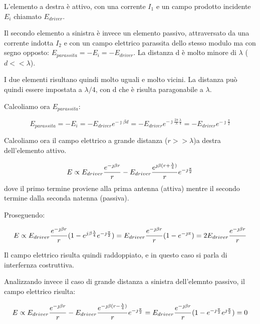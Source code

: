 L'elemento a destra è attivo, con una corrente $I_1$ e un campo prodotto incidente  $E_i$ chiamato $E_{driver}$.

Il secondo elemento a sinistra è invece un elemento passivo, attraversato da una corrente indotta $I_2$ e con un campo elettrico parassita dello stesso modulo ma con segno opposto: $E_{parassita} = -E_i = -E_{driver}$.
La distanza d è molto minore di $\lambda$ ($d<<\lambda$).

I due elementi risultano quindi molto uguali e  molto vicini.
La distanza può quindi essere impostata a $\lambda/4$, con d che è risulta paragonabile a $\lambda$.

Calcoliamo ora $E_{parassita}$:

\begin{equation}
E_{parassita} = -E_i = -E_{driver} e^{-\jmath \beta d} = -E_{driver} e^{-\jmath \frac{2 \pi}{\lambda} \frac{\lambda}{4}} = -E_{driver} e^{-\jmath \frac{\pi}{2}}
\end{equation}

Calcoliamo ora il campo elettrico a grande distanza ($r>>\lambda$)a destra dell'elemento attivo.

\begin{equation}
E \propto E_{driver}\frac{e^{-\jmath \beta r}}{r}-E_{driver}\frac{e^{\jmath\beta(r+\frac{\lambda}{4})}}{r}e^{-\jmath\frac{\pi}{2}}
\end{equation}
dove il primo termine proviene alla prima antenna (attiva) mentre il secondo termine dalla seconda natenna (passiva).

Proseguendo:

\begin{equation}
E \propto E_{driver}\frac{e^{-\jmath \beta r}}{r} (1-e^{j\beta\frac{\lambda}{4}}e^{-\jmath\frac{\pi}{2}}) =  E_{driver}\frac{e^{-\jmath \beta r}}{r} (1-e^{-\jmath\pi}) = 2E_{driver}\frac{e^{-\jmath \beta r}}{r}
\end{equation}

Il campo elettrico risulta quindi raddoppiato, e in questo caso si parla di interfernza costruttiva.

Analizzando invece il caso di grande distanza a sinistra dell'elemnto passivo, il campo elettrico risulta:

\begin{equation}
E \propto E_{driver}\frac{e^{-\jmath \beta r}}{r}-E_{driver}\frac{e^{-\jmath\beta(r-\frac{\lambda}{4})}}{r}e^{-\jmath\frac{\pi}{2}} =  E_{driver}\frac{e^{-\jmath \beta r}}{r} (1-e^{-\jmath\frac{\pi}{2}}e^{\jmath\frac{\pi}{2}}) = 0
\end{equation}

